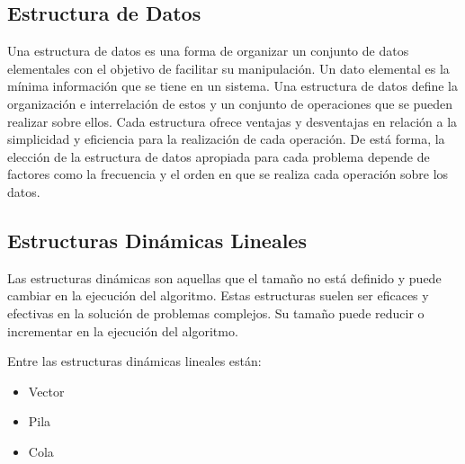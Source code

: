 \subsection{Estructura de Datos}
Una estructura de datos es una forma de organizar un conjunto de datos elementales con el objetivo
de facilitar su manipulación. Un dato elemental es la mínima información que se tiene en un sistema.
Una estructura de datos define la organización e interrelación de estos y un conjunto de operaciones
que se pueden realizar sobre ellos. Cada estructura ofrece ventajas y desventajas en relación a la
simplicidad y eficiencia para la realización de cada operación. De está forma, la elección de la
estructura de datos apropiada para cada problema depende de factores como la frecuencia y el orden
en que se realiza cada operación sobre los datos.

\subsection{Estructuras Dinámicas Lineales}
Las estructuras dinámicas son aquellas que el tamaño no está definido y puede cambiar en la
ejecución del algoritmo. Estas estructuras suelen ser eficaces y efectivas en la solución de problemas
complejos. Su tamaño puede reducir o incrementar en la ejecución del algoritmo.

Entre las estructuras dinámicas lineales están:
\begin{itemize}
	\item Vector
	\item Pila
	\item Cola
\end{itemize}